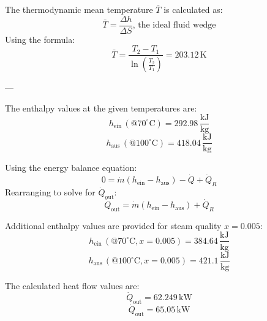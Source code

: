 The thermodynamic mean temperature \( \bar{T} \) is calculated as:  
\[
\bar{T} = \frac{\Delta h}{\Delta S}, \, \text{the ideal fluid wedge}
\]  
Using the formula:  
\[
\bar{T} = \frac{T_2 - T_1}{\ln\left(\frac{T_2}{T_1}\right)} = 203.12 \, \text{K}
\]  

---

The enthalpy values at the given temperatures are:  
\[
h_{\text{ein}} \, (@70^\circ\text{C}) = 292.98 \, \frac{\text{kJ}}{\text{kg}}
\]  
\[
h_{\text{aus}} \, (@100^\circ\text{C}) = 418.04 \, \frac{\text{kJ}}{\text{kg}}
\]  

Using the energy balance equation:  
\[
0 = \dot{m} (h_{\text{ein}} - h_{\text{aus}}) - \dot{Q} + \dot{Q}_R
\]  
Rearranging to solve for \( \dot{Q}_{\text{out}} \):  
\[
\dot{Q}_{\text{out}} = \dot{m} (h_{\text{ein}} - h_{\text{aus}}) + \dot{Q}_R
\]  

Additional enthalpy values are provided for steam quality \( x = 0.005 \):  
\[
h_{\text{ein}} \, (@70^\circ\text{C}, x = 0.005) = 384.64 \, \frac{\text{kJ}}{\text{kg}}
\]  
\[
h_{\text{aus}} \, (@100^\circ\text{C}, x = 0.005) = 421.1 \, \frac{\text{kJ}}{\text{kg}}
\]  

The calculated heat flow values are:  
\[
\dot{Q}_{\text{out}} = 62.249 \, \text{kW}
\]  
\[
\dot{Q}_{\text{out}} = 65.05 \, \text{kW}
\]